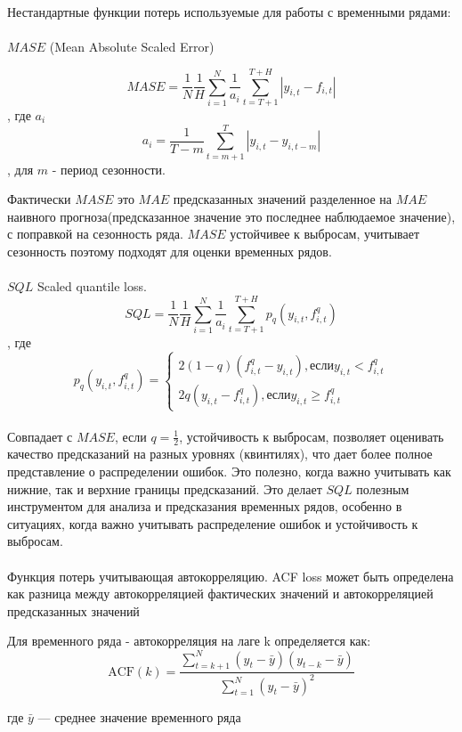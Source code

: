 Нестандартные функции потерь используемые для работы с временными рядами:\\
\\
$MASE$ (Mean Absolute Scaled Error)

$$MASE = \frac{1}{N} \frac{1}{H} \sum_{i = 1}^{N} \frac{1}{a_{i}}\sum_{t = T + 1} ^ {T + H}|y_{i,t} - f_{i,t}| $$ , где $a_{i}$
$$a_{i} = \frac{1}{T - m} \sum_{t = m + 1}^{T}|y_{i,t} - y_{i, t - m}|$$, для $m$ - период сезонности.

Фактически $MASE$ это $MAE$ предсказанных значений разделенное на $MAE$ наивного прогноза(предсказанное значение это последнее наблюдаемое значение), с поправкой на сезонность ряда.
$MASE$ устойчивее к выбросам, учитывает сезонность поэтому подходят для оценки временных рядов.\\
\\
$SQL$ Scaled quantile loss.
$$SQL = \frac{1}{N} \frac{1}{H} \sum_{i = 1}^{N} \frac{1}{a_{i}}\sum_{t = T + 1} ^ {T + H}p_{q}(y_{i,t}, f_{i,t}^{q})$$, где
$$p_{q}(y_{i,t}, f_{i,t}^{q}) = \begin{cases}
    2(1 - q)(f_{i,t}^q - y_{i,t}), если y_{i,t} < f_{i,t}^q\\
    2q(y_{i,t} - f_{i,t}^q ),если y_{i,t} \geq f_{i,t}^q
\end{cases}$$
\\
Совпадает с $MASE$, если $q = \frac{1}{2}$, устойчивость к выбросам, позволяет оценивать качество предсказаний на разных уровнях (квинтилях), что дает более полное представление о распределении ошибок. Это полезно, когда важно учитывать как нижние, так и верхние границы предсказаний. Это делает $SQL$ полезным инструментом для анализа и предсказания временных рядов, особенно в ситуациях, когда важно учитывать распределение ошибок и устойчивость к выбросам.\\
\\
Функция потерь учитывающая автокорреляцию. ACF loss может быть определена как разница между автокорреляцией фактических значений и автокорреляцией предсказанных значений

Для временного ряда - автокорреляция на лаге k определяется как:
    \[
   \text{ACF}(k) = \frac{\sum_{t=k+1}^{N} (y_t - \bar{y})(y_{t-k} - \bar{y})}{\sum_{t=1}^{N} (y_t - \bar{y})^2}
   \]

   где \( \bar{y} \) — среднее значение временного ряда\\

